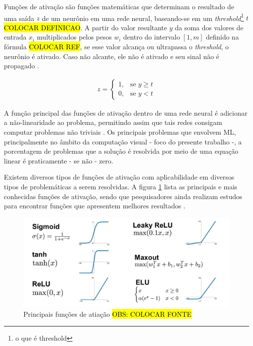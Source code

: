 Funções de ativação são funções matemáticas que determinam o resultado de uma saída \textbf{\(z\)} de um neurônio em uma rede neural, baseando-se em um \textit{threshold}\footnote{
  o que é threshold
} \textbf{\(t\)} \hl{COLOCAR DEFINICAO}.
A partir do valor resultante \textbf{\(y\)} da soma dos valores de entrada \(x_i\) multiplicados pelos pesos \(w_i\) dentro do intervalo \([1, m]\) definido na fórmula \hl{COLOCAR REF}, se esse valor alcança ou ultrapassa o \textit{threshold}, o neurônio é ativado. Caso não alcante, ele não é ativado e seu sinal não é propagado \cite{python-ml}.

\begin{gather}
  z =
  \begin{cases}
    1, & \text{se } y\geq \textit{t} \\
    0, & \text{se } y < \textit{t}
  \end{cases}
  \label{math:threshold}
\end{gather}

A função principal das funções de ativação dentro de uma rede neural é adicionar a não-linearidade ao problema, permitindo assim que tais redes consigam computar problemas não triviais \cite{gentle-intro-to-nn}. Os principais problemas que envolvem ML, principalmente no âmbito da computação visual - foco do presente trabalho -, a porcentagem de problemas que a solução é resolvida por meio de uma equação linear é praticamente - se não - zero.

Existem diversos tipos de funções de ativação com aplicabilidade em diversos tipos de problemáticas a serem resolvidas. A figura \ref{fig:activation-functions} lista as principais e mais conhecidas funções de ativação, sendo que pesquisadores ainda realizam estudos para encontrar funções que apresentem melhores resultados \cite{intro-to-act-func}.


\begin{figure}[H]
  \includegraphics[width=12cm, center]{figuras/activation-functions}
  \caption{Principais funções de atiação \hl{OBS: COLOCAR FONTE}}
  \label{fig:activation-functions}
\end{figure}

